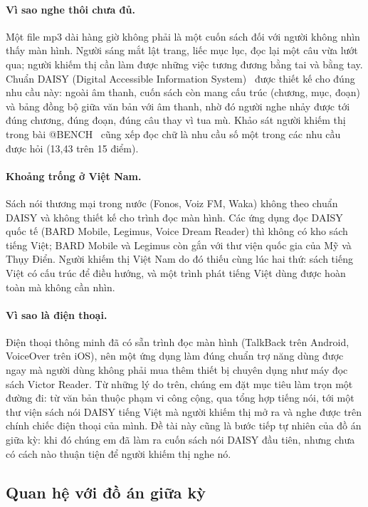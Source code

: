 \documentclass[12pt,a4paper]{article}
\begin{document}
\paragraph{Vì sao nghe thôi chưa đủ.} Một file mp3 dài hàng giờ không phải là một cuốn sách đối với người không nhìn thấy màn hình. Người sáng mắt lật trang, liếc mục lục, đọc lại một câu vừa lướt qua; người khiếm thị cần làm được những việc tương đương bằng tai và bằng tay. Chuẩn DAISY (Digital Accessible Information System)~\cite{b9} được thiết kế cho đúng nhu cầu này: ngoài âm thanh, cuốn sách còn mang cấu trúc (chương, mục, đoạn) và bảng đồng bộ giữa văn bản với âm thanh, nhờ đó người nghe nhảy được tới đúng chương, đúng đoạn, đúng câu thay vì tua mù. Khảo sát người khiếm thị trong bài @BENCH~\cite{b4} cũng xếp đọc chữ là nhu cầu số một trong các nhu cầu được hỏi (13,43 trên 15 điểm).

\paragraph{Khoảng trống ở Việt Nam.} Sách nói thương mại trong nước (Fonos, Voiz FM, Waka) không theo chuẩn DAISY và không thiết kế cho trình đọc màn hình. Các ứng dụng đọc DAISY quốc tế (BARD Mobile, Legimus, Voice Dream Reader) thì không có kho sách tiếng Việt; BARD Mobile và Legimus còn gắn với thư viện quốc gia của Mỹ và Thụy Điển. Người khiếm thị Việt Nam do đó thiếu cùng lúc hai thứ: sách tiếng Việt có cấu trúc để điều hướng, và một trình phát tiếng Việt dùng được hoàn toàn mà không cần nhìn.

\paragraph{Vì sao là điện thoại.} Điện thoại thông minh đã có sẵn trình đọc màn hình (TalkBack trên Android, VoiceOver trên iOS), nên một ứng dụng làm đúng chuẩn trợ năng dùng được ngay mà người dùng không phải mua thêm thiết bị chuyên dụng như máy đọc sách Victor Reader. Từ những lý do trên, chúng em đặt mục tiêu làm trọn một đường đi: từ văn bản thuộc phạm vi công cộng, qua tổng hợp tiếng nói, tới một thư viện sách nói DAISY tiếng Việt mà người khiếm thị mở ra và nghe được trên chính chiếc điện thoại của mình. Đề tài này cũng là bước tiếp tự nhiên của đồ án giữa kỳ: khi đó chúng em đã làm ra cuốn sách nói DAISY đầu tiên, nhưng chưa có cách nào thuận tiện để người khiếm thị nghe nó.

\subsection{Quan hệ với đồ án giữa kỳ}
\end{document}
